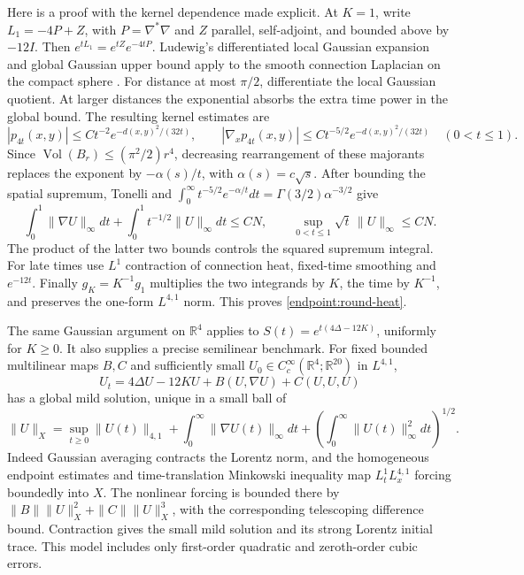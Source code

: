 \documentclass[11pt]{article}
\numberwithin{equation}{section}
\theoremstyle{definition}
\theoremstyle{remark}
\begin{document}
Here is a proof with the kernel dependence made explicit.
At $K=1$, write $L_1=-4P+Z$, with $P=\nabla^*\nabla$ and
$Z$ parallel, self-adjoint, and bounded above by $-12I$.
Then $e^{tL_1}=e^{tZ}e^{-4tP}$.
Ludewig's differentiated local Gaussian expansion and global
Gaussian upper bound apply to the smooth connection Laplacian on
the compact sphere \cite[Theorems 1.1 and 3.5]{Ludewig2019}.
For distance at most $\pi/2$, differentiate the local Gaussian
quotient.  At larger distances the exponential absorbs the extra
time power in the global bound.  The resulting kernel estimates are
\[
 |p_{4t}(x,y)|\le Ct^{-2}e^{-d(x,y)^2/(32t)},\qquad
 |\nabla_xp_{4t}(x,y)|\le Ct^{-5/2}e^{-d(x,y)^2/(32t)}
 \quad(0<t\le1).
\]
Since $\operatorname{Vol}(B_r)\le(\pi^2/2)r^4$, decreasing
rearrangement of these majorants replaces the exponent by
$-\alpha(s)/t$, with $\alpha(s)=c\sqrt{s}$.
After bounding the spatial supremum, Tonelli and
$\int_0^\infty t^{-5/2}e^{-\alpha/t}dt
=\Gamma(3/2)\alpha^{-3/2}$ give
\[
 \int_0^1\|\nabla U\|_\infty dt+
 \int_0^1t^{-1/2}\|U\|_\infty dt\le CN,\qquad
 \sup_{0<t\le1}\sqrt t\,\|U\|_\infty\le CN.
\]
The product of the latter two bounds controls the squared supremum
integral.  For late times use $L^1$ contraction of connection heat,
fixed-time smoothing and $e^{-12t}$.  Finally $g_K=K^{-1}g_1$
multiplies the two integrands by $K$, the time by $K^{-1}$,
and preserves the one-form $L^{4,1}$ norm.  This proves
\eqref{endpoint:round-heat}.

The same Gaussian argument on $\mathbb R^4$ applies to
$S(t)=e^{t(4\Delta-12K)}$, uniformly for $K\ge0$.
It also supplies a precise semilinear benchmark.  For fixed bounded
multilinear maps $B,C$ and sufficiently small
$U_0\in C_c^\infty(\mathbb R^4;\mathbb R^{20})$ in $L^{4,1}$,
\[
 U_t=4\Delta U-12KU+B(U,\nabla U)+C(U,U,U)
\]
has a global mild solution, unique in a small ball of
\[
 \|U\|_X=\sup_{t\ge0}\|U(t)\|_{4,1}
       +\int_0^\infty\|\nabla U(t)\|_\infty dt
       +\left(\int_0^\infty\|U(t)\|_\infty^2dt\right)^{1/2}.
\]
Indeed Gaussian averaging contracts the Lorentz norm, and the
homogeneous endpoint estimates and time-translation Minkowski
inequality map $L^1_tL^{4,1}_x$ forcing boundedly into $X$.
The nonlinear forcing is bounded there by
$\|B\|\|U\|_X^2+\|C\|\|U\|_X^3$, with the corresponding
telescoping difference bound.  Contraction gives the small mild
solution and its strong Lorentz initial trace.  This model includes
only first-order quadratic and zeroth-order cubic errors.
\end{document}

